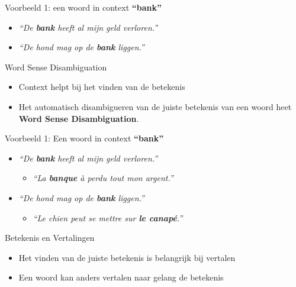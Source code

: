 \documentclass[8pt]{beamer}
\begin{document}
\begin{frame}

    \begin{block}{Voorbeeld 1: een woord in context}
        {\Large\textbf{``bank''}}
        \begin{itemize}
            \item \emph{``De \textbf{bank} heeft al mijn geld verloren.''}
            \item \emph{``De hond mag op de \textbf{bank} liggen.''}
        \end{itemize}
    \end{block}

    \begin{block}{Word Sense Disambiguation}
        \begin{itemize}
            \item Context helpt bij het vinden van de betekenis
            \item Het automatisch disambigueren van de juiste betekenis van een woord heet \textbf{Word Sense Disambiguation}.
        \end{itemize}
    \end{block}
\end{frame}


\begin{frame}

    \begin{block}{Voorbeeld 1: Een woord in context}
        {\Large\textbf{``bank''}}
        \begin{itemize}
            \item \emph{``De \textbf{bank} heeft al mijn geld verloren.''}
            \begin{itemize}
                \item<2-> \emph{``La \textbf{banque} à perdu tout mon argent.''}
            \end{itemize}
            \item \emph{``De hond mag op de \textbf{bank} liggen.''}
            \begin{itemize}
                \item<2-> \emph{``Le chien peut se mettre sur \textbf{le canapé}.''}
            \end{itemize}
        \end{itemize}
    \end{block}

    \begin{block}{Betekenis en Vertalingen}
        \begin{itemize}
            \item Het vinden van de juiste betekenis is belangrijk bij vertalen
            \item Een woord kan anders vertalen naar gelang de betekenis
        \end{itemize}
    \end{block}


\end{frame}
\end{document}
